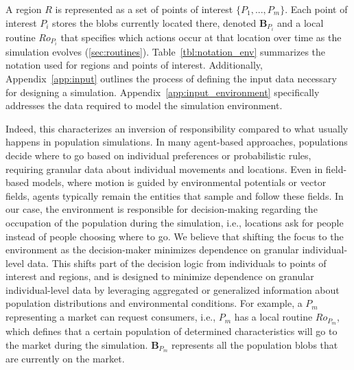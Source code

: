 \documentclass[pdflatex,sn-mathphys-num]{sn-jnl}%
\newcommand\redb[1]{#1}
\theoremstyle{thmstyleone}%
\theoremstyle{thmstyletwo}%
\theoremstyle{thmstylethree}%
\begin{document}
\redb{A region $R$ is represented as a set of points of interest $\{P_1, ..., P_m\}$. Each point of interest $P_i$ stores the blobs currently located there, denoted $\bm{B}_{P_i}$ and a local routine $Ro_{P_i}$
that specifies which actions occur at that location over time as the simulation evolves (\ref{sec:routines}). Table~\ref{tbl:notation_env} summarizes the notation used for regions and points of interest.} 
Additionally, Appendix~\ref{app:input} outlines the process of defining the input data necessary for designing a simulation. Appendix~\ref{app:input_environment} specifically addresses the data required to model the simulation environment.



Indeed, this characterizes an inversion of responsibility compared to what usually happens in population simulations. \redb{In many agent-based approaches, populations decide where to go based on individual preferences or probabilistic rules, requiring granular data about individual movements and locations. Even in field-based models, where motion is guided by environmental potentials or vector fields, agents typically remain the entities that sample and follow these fields.
In our case, the environment is responsible for decision-making regarding the occupation of the population during the simulation, i.e., locations ask for people instead of people choosing where to go. We believe that shifting the focus to the environment as the decision-maker minimizes dependence on granular individual-level data. This shifts part of the decision logic from individuals to points of interest and regions, and is designed to minimize dependence on granular individual-level data by leveraging aggregated or generalized information about population distributions and environmental conditions. }%
For example, a $P_m$ representing a market can request consumers, i.e., $P_m$ has a local routine $Ro_{P_m}$, which defines that a certain population of determined characteristics will go to the market during the simulation. $\bm{B}_{P_m}$ represents all the population blobs that are currently on the market.
\end{document}
